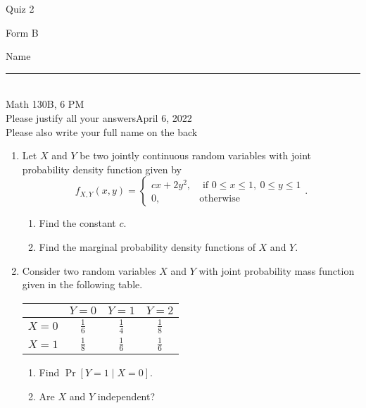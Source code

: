 \documentclass[12pt]{article}
\begin{document}
\begin{flushleft} 
\centerline{\LARGE{Quiz 2}} 
\vspace{5 mm}
{Form B}\hfill  
{Name \rule {2 in}{0.01in}}\\
Math 130B, 6 PM
\\
{Please justify all your answers}\hfill {April 6, 2022}
\\
{Please also write your full name on the back} 

\medskip
\end{flushleft}

\begin{enumerate}

	\item Let $X$ and $Y$ be two jointly continuous random variables with joint probability density function given by
	\[
	f_{X,Y}(x,y) = \begin{cases}
		cx + 2y^2, & \text{ if }0\leq x \leq 1,\ 0\leq y\leq 1\\
		0, & \text{otherwise}
	\end{cases}.
	\]
	\begin{enumerate}
		\item Find the constant $c$.
		\vfill

		\item Find the marginal probability density functions of $X$ and $Y$.
	\end{enumerate}

	\vfill

	\item Consider two random variables $X$ and $Y$ with joint probability mass function given in the following table.
	\begin{center}
		\begin{tabular}{|c||c|c|c|}
			\hline
			& $Y=0$ & $Y=1$ & $Y=2$\\
			\hline\hline
			$X=0$ & $\frac{1}{6}$ & $\frac{1}{4}$ & $\frac{1}{8}$\\
			\hline
			$X=1$ & $\frac{1}{8}$ & $\frac{1}{6}$ & $\frac{1}{6}$\\
			\hline
		\end{tabular}
	\end{center}
	\begin{enumerate}
		\item Find $\Pr[Y=1 \mid X=0]$.
		\vfill

		\item Are $X$ and $Y$ independent?


	\end{enumerate}

	\vfill\null
\end{enumerate}
\end{document}
